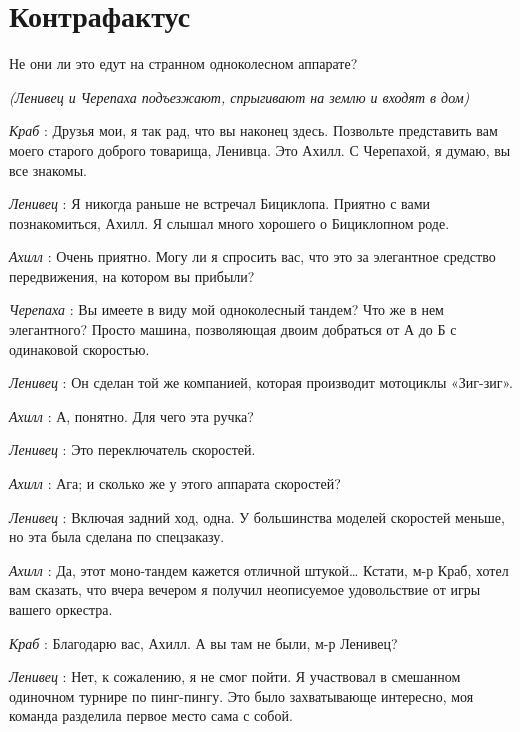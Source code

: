 \documentclass[../main.tex]{subfiles}
\begin{document}
\section{Контрафактус}


\begin{dialogue}

 Не они ли это едут на странном одноколесном аппарате?

\emph{(Ленивец и Черепаха подъезжают, спрыгивают на землю и входят в дом)}

\emph{Краб} : Друзья мои, я так рад, что вы наконец здесь. Позвольте представить вам моего старого доброго товарища, Ленивца. Это Ахилл. С Черепахой, я думаю, вы все знакомы.

\emph{Ленивец} : Я никогда раньше не встречал Бициклопа. Приятно с вами познакомиться, Ахилл. Я слышал много хорошего о Бициклопном роде.

\emph{Ахилл} : Очень приятно. Могу ли я спросить вас, что это за элегантное средство передвижения, на котором вы прибыли?

\emph{Черепаха} : Вы имеете в виду мой одноколесный тандем? Что же в нем элегантного? Просто машина, позволяющая двоим добраться от А до Б с одинаковой скоростью.

\emph{Ленивец} : Он сделан той же компанией, которая производит мотоциклы «Зиг-зиг».

\emph{Ахилл} : А, понятно. Для чего эта ручка?

\emph{Ленивец} : Это переключатель скоростей.

\emph{Ахилл} : Ага; и сколько же у этого аппарата скоростей?

\emph{Ленивец} : Включая задний ход, одна. У большинства моделей скоростей меньше, но эта была сделана по спецзаказу.

\emph{Ахилл} : Да, этот моно-тандем кажется отличной штукой\ldots{} Кстати, м-р Краб, хотел вам сказать, что вчера вечером я получил неописуемое удовольствие от игры вашего оркестра.

\emph{Краб} : Благодарю вас, Ахилл. А вы там не были, м-р Ленивец?

\emph{Ленивец} : Нет, к сожалению, я не смог пойти. Я участвовал в смешанном одиночном турнире по пинг-пингу. Это было захватывающе интересно, моя команда разделила первое место сама с собой.


\end{dialogue}
\end{document}
